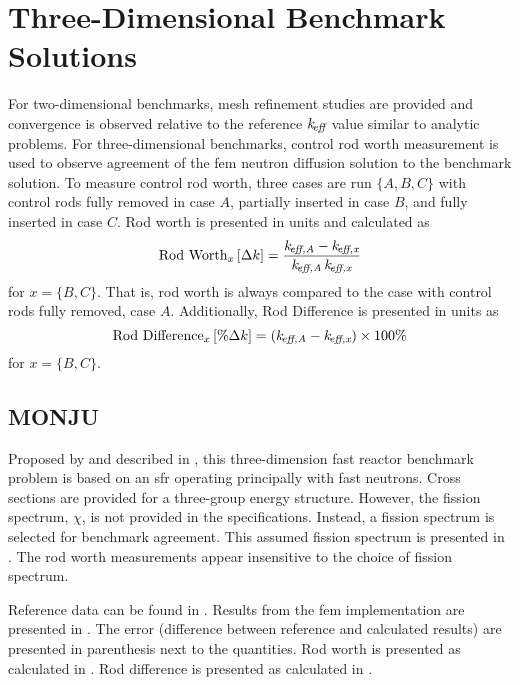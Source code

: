 \section{Three-Dimensional Benchmark Solutions}
  \label{sec:three_dimensional_benchmark_solutions}
  For two-dimensional benchmarks, mesh refinement studies are provided and
  convergence is observed relative to the reference $k_{\!\mbox{\scriptsize \em eff}}$ value similar to
  analytic problems. For three-dimensional benchmarks, control rod worth
  measurement is used to observe agreement of the \gls{fem} neutron diffusion
  solution to the benchmark solution. To measure control rod worth, three cases
  are run $\{A,B,C\}$ with control rods fully removed in case $A$, partially
  inserted in case $B$, and fully inserted in case $C$. Rod worth is presented
  in units  and calculated as 
  \begin{equation}
    \label{eq:rodworth}
    \text{Rod Worth}_x \left[\text{{$\Delta k$}}\right] = \frac{k_{\!\mbox{\scriptsize \em eff,{A}}} - k_{\!\mbox{\scriptsize \em eff,{x}}}}
      {k_{\!\mbox{\scriptsize \em eff,{A}}} \, k_{\!\mbox{\scriptsize \em eff,{x}}}}
  \end{equation}
  for $x = \{B,C\}$. That is, rod worth is always compared to the case with
  control rods fully removed, case $A$. Additionally, Rod Difference is
  presented in units  as
  \begin{equation}
    \label{eq:roddifference}
    \text{Rod Difference}_x \left[\text{{$\% \Delta k$}}\right] = (k_{\!\mbox{\scriptsize \em eff,{A}}} - k_{\!\mbox{\scriptsize \em eff,{x}}}) 
      \times 100 \%
  \end{equation}
  for $x = \{B,C\}$.

  \subsection{MONJU}
    Proposed by \textcite{monjuBenchmark} and described in 
    , this three-dimension fast reactor benchmark problem is 
    based on an \gls{sfr} operating principally with fast neutrons. Cross 
    sections are provided for a three-group energy structure. However, the 
    fission spectrum, $\chi$, is not provided in the specifications. 
    Instead, a fission spectrum is selected for benchmark agreement. This 
    assumed fission spectrum is presented in . The rod worth 
    measurements appear insensitive to the choice of fission spectrum. 

    Reference data can be found in . Results from the
    \gls{fem} implementation are presented in . The error
    (difference between reference and calculated results) are presented in
    parenthesis next to the quantities. Rod worth is presented as calculated in
    . Rod difference is presented as calculated in
    .

